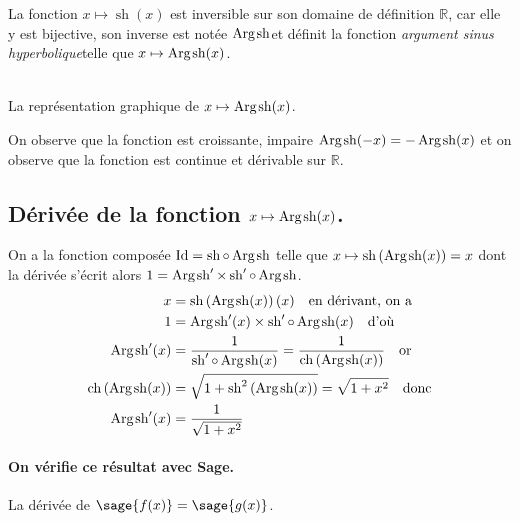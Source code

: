 \documentclass[a4paper,12pt]{report}
\def\eclaire{\mathbb}
\def\R{\ensuremath{\eclaire R}}
\def\Id{\ensuremath{\mathrm{Id}}}
\renewcommand{\sinh}{\mathop{\mathrm{sh}}}
\renewcommand{\cosh}{\mathop{\mathrm{ch}}}
\renewcommand{\arg}{\mathop{\mathrm{Arg}}}
\begin{document}
La fonction $x \mapsto \sinh(x)$ est inversible sur son domaine de définition $\R$, car elle y est bijective, son inverse est notée \og$ \arg\mspace{-1mu}\sinh $\fg et définit la fonction \og\emph{argument sinus hyperbolique}\fg telle que $x \mapsto \arg\mspace{-1mu}\sinh(x)$.


\begin{center}
 \\
La représentation graphique de $x \mapsto \arg\mspace{-1mu}\sinh(x)$.
\end{center}
On observe que la fonction est croissante, impaire $\arg\mspace{-1mu}\sinh(-x) = -\arg\mspace{-1mu}\sinh(x) $
et on observe que la fonction est continue et dérivable sur $\R$.                                                                                                             

\subsection{Dérivée de la fonction $x \mapsto \arg\mspace{-1mu}\sinh(x)$.\label{argsinh}}
On a la fonction composée $\Id = \sinh \circ \arg\mspace{-1mu}\sinh$ telle que $x\mapsto\sinh\left(\arg\mspace{-1mu}\sinh(x)\right)=x$ dont la dérivée s'écrit alors $1= \arg\mspace{-1mu}\sinh\nolimits' \times \sinh\nolimits'\circ\arg\mspace{-1mu}\sinh$.
\begin{align*}
x & =\sinh\left(\arg\mspace{-1mu}\sinh(x)\right)(x) \quad \textrm{en dérivant, on a}\\
1 & = \arg\mspace{-1mu}\sinh\nolimits'(x) \times \sinh\nolimits'\circ\arg\mspace{-1mu}\sinh(x) \quad \textrm{d'où}\\
\arg\mspace{-1mu}\sinh\nolimits'(x) & =\frac{1}{ \sinh\nolimits'\circ\arg\mspace{-1mu}\sinh(x)}=\frac{1}{ \cosh\left(\arg\mspace{-1mu}\sinh(x)\right)}\quad \textrm{or}\\
\cosh\left(\arg\mspace{-1mu}\sinh(x)\right) & = \sqrt{1+\sinh\nolimits^2\left(\arg\mspace{-1mu}\sinh(x)\right)}=\sqrt{1+x^2}\quad \textrm{donc}\\
\arg\mspace{-1mu}\sinh\nolimits'(x) & = \frac{1}{ \sqrt{1+x^2}}
\end{align*}


\paragraph{On vérifie ce résultat avec Sage.}
La dérivée de $\sage{f(x)} = \sage{g(x)} $.
\end{document}
